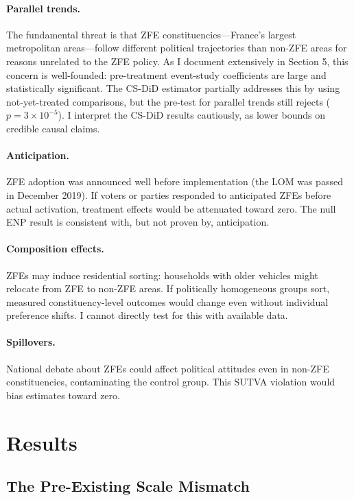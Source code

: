 \documentclass[12pt]{article}
\begin{document}
\paragraph{Parallel trends.} The fundamental threat is that ZFE constituencies---France's largest metropolitan areas---follow different political trajectories than non-ZFE areas for reasons unrelated to the ZFE policy. As I document extensively in Section 5, this concern is well-founded: pre-treatment event-study coefficients are large and statistically significant. The CS-DiD estimator partially addresses this by using not-yet-treated comparisons, but the pre-test for parallel trends still rejects ($p = 3 \times 10^{-5}$). I interpret the CS-DiD results cautiously, as lower bounds on credible causal claims.

\paragraph{Anticipation.} ZFE adoption was announced well before implementation (the LOM was passed in December 2019). If voters or parties responded to anticipated ZFEs before actual activation, treatment effects would be attenuated toward zero. The null ENP result is consistent with, but not proven by, anticipation.

\paragraph{Composition effects.} ZFEs may induce residential sorting: households with older vehicles might relocate from ZFE to non-ZFE areas. If politically homogeneous groups sort, measured constituency-level outcomes would change even without individual preference shifts. I cannot directly test for this with available data.

\paragraph{Spillovers.} National debate about ZFEs could affect political attitudes even in non-ZFE constituencies, contaminating the control group. This SUTVA violation would bias estimates toward zero.


\section{Results}

\subsection{The Pre-Existing Scale Mismatch}
\end{document}
